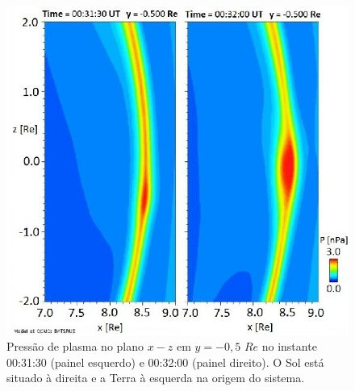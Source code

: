 \begin{figure}
	\begin{center}
		\includegraphics[scale=0.40]{pressaotempo1.jpg}
		\caption{Pressão de plasma no plano $x-z$ em $y= -0,5$ $Re$ no instante 00:31:30 (painel esquerdo) e 00:32:00 (painel direito). O Sol está situado à direita e a Terra à esquerda na origem do sistema.}
		\label{pressaotempo}
	\end{center}
\end{figure}


